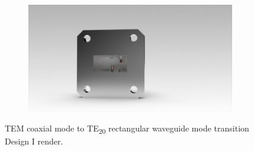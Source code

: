 \documentclass[english,twoside]{article}
\begin{document}
\begin{figure}[H]
\begin{subfigure}[b]{0.48\textwidth}
			\end{subfigure}		
			~
			\begin{subfigure}[b]{0.48\textwidth}
				\includegraphics[width=\textwidth]{renders/coaxToWrTE20_screw-4}
			\end{subfigure}	
			\caption{TEM coaxial mode to TE\textsubscript{20} rectangular waveguide mode transition Design I render.}
		\end{figure}	
	
\end{document}
